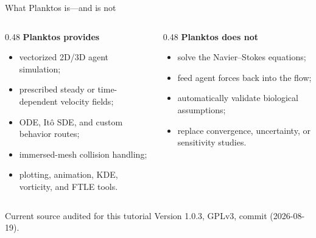 \documentclass[aspectratio=169,11pt]{beamer}
\begin{document}
\begin{frame}{What Planktos is---and is not}
\begin{columns}[T,onlytextwidth]
  \begin{column}{0.48\textwidth}
    \textbf{Planktos provides}
    \begin{itemize}
      \item vectorized 2D/3D agent simulation;
      \item prescribed steady or time-dependent velocity fields;
      \item ODE, It\^o SDE, and custom behavior routes;
      \item immersed-mesh collision handling;
      \item plotting, animation, KDE, vorticity, and FTLE tools.
    \end{itemize}
  \end{column}
  \begin{column}{0.48\textwidth}
    \textbf{Planktos does not}
    \begin{itemize}
      \item solve the Navier--Stokes equations;
      \item feed agent forces back into the flow;
      \item automatically validate biological assumptions;
      \item replace convergence, uncertainty, or sensitivity studies.
    \end{itemize}
  \end{column}
\end{columns}
\begin{block}{Current source audited for this tutorial}
Version 1.0.3, GPLv3, commit  (2026-08-19).
\end{block}
\end{frame}
\end{document}
